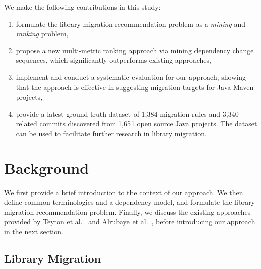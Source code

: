 \documentclass[conference, 10pt]{IEEEtran}
\begin{document}
We make the following contributions in this study:
\begin{enumerate}
    \item formulate the library migration recommendation problem as a \textit{mining} and \textit{ranking} problem, 
    \item propose a new multi-metric ranking approach via mining dependency change sequences, which significantly outperforms existing approaches,
    \item implement and conduct a systematic evaluation for our approach, showing that the approach is effective in suggesting migration targets for Java Maven projects,
    \item provide a latest ground truth dataset of 1,384 migration rules and 3,340 related commits discovered from 1,651 open source Java projects. The dataset can be used to facilitate further research in library migration.
\end{enumerate}

\section{Background}

We first provide a brief introduction to the context of our approach. 
We then define common terminologies and a dependency model, and formulate the library migration recommendation problem. 
Finally, we discuss the existing approaches provided by Teyton et al.~\cite{2012WCRE-Teyton-Mining, 2014JournalOfSysAndSoft-Teyton-Study} and Alrubaye et al.~\cite{2019ICSME-Alrubaye-MigrationMiner}, before introducing our approach in the next section.

\subsection{Library Migration}
\end{document}

